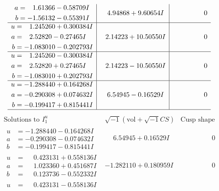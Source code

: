 \documentclass[1p]{elsarticle_modified}
\theoremstyle{definition}
\newcommand{\I}{\sqrt{-1}}
\begin{document}
$$\begin{array}{c|c|c}
\begin{aligned}
a &= \phantom{-}1.61366 - 0.58709 I \\
b &= -1.56132 - 0.55391 I\end{aligned}
 & \phantom{-}4.94868 + 9.60654 I & \phantom{-0.000000 } 0 \\ \hline\begin{aligned}
u &= \phantom{-}1.245260 + 0.300384 I \\
a &= \phantom{-}2.52820 - 0.27465 I \\
b &= -1.083010 - 0.202793 I\end{aligned}
 & \phantom{-}2.14223 + 10.50550 I & \phantom{-0.000000 } 0 \\ \hline\begin{aligned}
u &= \phantom{-}1.245260 - 0.300384 I \\
a &= \phantom{-}2.52820 + 0.27465 I \\
b &= -1.083010 + 0.202793 I\end{aligned}
 & \phantom{-}2.14223 - 10.50550 I & \phantom{-0.000000 } 0 \\ \hline\begin{aligned}
u &= -1.288440 + 0.164268 I \\
a &= -0.290308 + 0.074632 I \\
b &= -0.199417 + 0.815441 I\end{aligned}
 & \phantom{-}6.54945 - 0.16529 I & \phantom{-0.000000 } 0\\
 \hline 
 \end{array}$$\newpage$$\begin{array}{c|c|c}  
\text{Solutions to }I^u_{1}& \I (\text{vol} + \sqrt{-1}CS) & \text{Cusp shape}\\
 \hline 
\begin{aligned}
u &= -1.288440 - 0.164268 I \\
a &= -0.290308 - 0.074632 I \\
b &= -0.199417 - 0.815441 I\end{aligned}
 & \phantom{-}6.54945 + 0.16529 I & \phantom{-0.000000 } 0 \\ \hline\begin{aligned}
u &= \phantom{-}0.423131 + 0.558136 I \\
a &= \phantom{-}1.023360 + 0.451687 I \\
b &= \phantom{-}0.123736 - 0.552332 I\end{aligned}
 & -1.282110 + 0.180959 I & \phantom{-0.000000 } 0 \\ \hline\begin{aligned}
u &= \phantom{-}0.423131 - 0.558136 I \\

\end{aligned}
\end{array}$$
\end{document}
